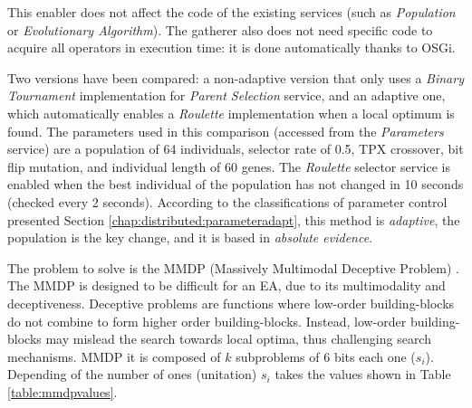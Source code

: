 This enabler does not affect the code of the existing services (such as {\em Population} or {\em Evolutionary Algorithm}). The gatherer also does not need specific code to acquire all operators in execution time: it is done automatically thanks to
OSGi. %

Two versions have been compared: a non-adaptive version that only uses a {\em Binary Tournament} implementation for {\em Parent Selection} service, and an adaptive one, which automatically enables a {\em Roulette} implementation when a local optimum is found. The parameters used in this comparison (accessed from the {\em Parameters} service) are a population of 64 individuals, selector rate of 0.5, TPX crossover, bit flip mutation, and individual length of 60 genes. The {\em Roulette} selector service is enabled when the best individual of the population has not changed in 10 seconds (checked every 2 seconds). According to the classifications of parameter control presented Section \ref{chap:distributed:parameteradapt}, this method is {\em adaptive}, the population is the key change, and it is based in {\em absolute evidence}. 

The problem to solve is the MMDP (Massively Multimodal Deceptive Problem) \cite{goldberg92massive}. The MMDP is designed to be difficult for an EA, due to
its multimodality and deceptiveness. Deceptive problems are functions where low-order building-blocks do not combine to form higher order building-blocks. Instead, low-order building-blocks may mislead the search towards local optima, thus challenging search mechanisms. MMDP it is composed of $k$ subproblems of 6 bits each one ($s_i$). Depending of
the number of ones (unitation) $s_i$ takes the values shown in Table \ref{table:mmdpvalues}.  

\begin{table}
\caption{ Basic deceptive bipolar function ($s_i$) for MMDP.}
\label{table:mmdpvalues} %

\end{table}



